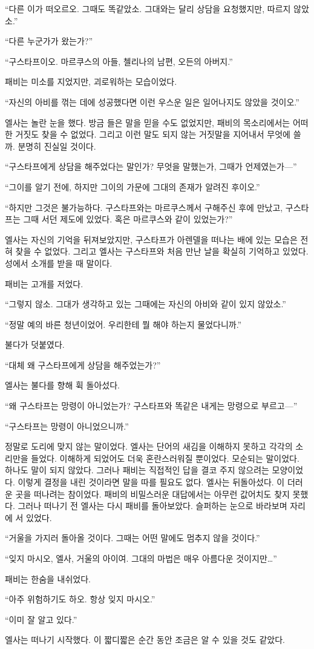 ``다른 이가 떠오르오. 그때도 똑같았소. 그대와는 달리 상담을 요청했지만, 따르지 않았소.''

``다른 누군가가 왔는가?''

``구스타프이오. 마르쿠스의 아들, 첼리나의 남편, 오든의 아버지.''

패비는 미소를 지었지만, 괴로워하는 모습이었다.

``자신의 아비를 꺾는 데에 성공했다면 이런 우스운 일은 일어나지도 않았을 것이오.''

엘사는 놀란 눈을 했다. 방금 들은 말을 믿을 수도 없었지만, 패비의 목소리에서는 어떠한 거짓도 찾을 수 없었다. 그리고 이런 말도 되지 않는 거짓말을 지어내서 무엇에 쓸까. 분명히 진실일 것이다.

``구스타프에게 상담을 해주었다는 말인가? 무엇을 말했는가, 그때가 언제였는가—''

``그이를 알기 전에, 하지만 그이의 가문에 그대의 존재가 알려진 후이오.''

``하지만 그것은 불가능하다. 구스타프와는 마르쿠스께서 구해주신 후에 만났고, 구스타프는 그때 서던 제도에 있었다. 혹은 마르쿠스와 같이 있었는가?''

엘사는 자신의 기억을 뒤져보았지만, 구스타프가 아렌델을 떠나는 배에 있는 모습은 전혀 찾을 수 없었다. 그리고 엘사는 구스타프와 처음 만난 날을 확실히 기억하고 있었다. 성에서 소개를 받을 때 말이다.

패비는 고개를 저었다.

``그렇지 않소. 그대가 생각하고 있는 그때에는 자신의 아비와 같이 있지 않았소.''

``정말 예의 바른 청년이었어. 우리한테 뭘 해야 하는지 물었다니까.''

불다가 덧붙였다.

``대체 왜 구스타프에게 상담을 해주었는가?''

엘사는 불다를 향해 휙 돌아섰다.

``왜 구스타프는 망령이 아니었는가? 구스타프와 똑같은 내게는 망령으로 부르고—''

``구스타프는 망령이 아니었으니까.''

정말로 도리에 맞지 않는 말이었다. 엘사는 단어의 새김을 이해하지 못하고 각각의 소리만을 들었다. 이해하게 되었어도 더욱 혼란스러워질 뿐이었다. 모순되는 말이었다. 하나도 말이 되지 않았다. 그러나 패비는 직접적인 답을 결코 주지 않으려는 모양이었다. 이렇게 결정을 내린 것이라면 말을 따를 필요도 없다. 엘사는 뒤돌아섰다. 이 더러운 곳을 떠나려는 참이었다. 패비의 비밀스러운 대답에서는 아무런 값어치도 찾지 못했다. 그러나 떠나기 전 엘사는 다시 패비를 돌아보았다. 슬퍼하는 눈으로 바라보며 자리에 서 있었다.

``거울을 가지러 돌아올 것이다. 그때는 어떤 말에도 멈추지 않을 것이다.''

``잊지 마시오, 엘사, 거울의 아이여. 그대의 마법은 매우 아름다운 것이지만\ldots''

패비는 한숨을 내쉬었다.

``아주 위험하기도 하오. 항상 잊지 마시오.''

``이미 잘 알고 있다.''

엘사는 떠나기 시작했다. 이 짧디짧은 순간 동안 조금은 알 수 있을 것도 같았다.

